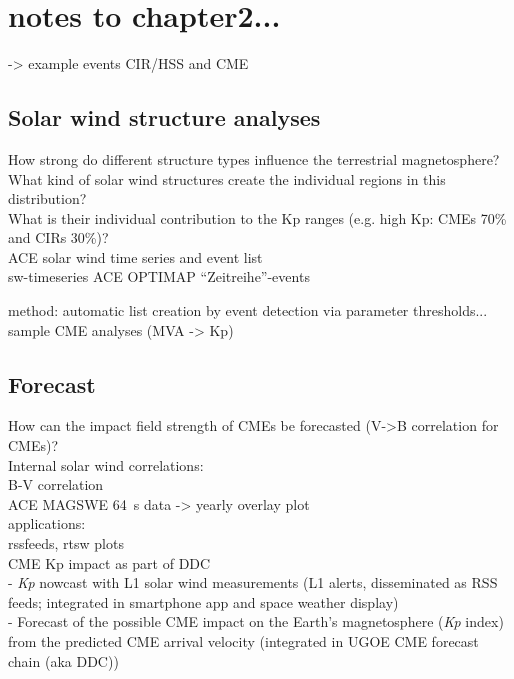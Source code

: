 
\chapter{notes to chapter2...}


-> example events CIR/HSS and CME\\



\section{Solar wind structure analyses}
How strong do different structure types influence the terrestrial magnetosphere?\\
What kind of solar wind structures create the individual regions in this distribution?\\
What is their individual contribution to the Kp ranges (e.g. high Kp: CMEs 70\% and CIRs 30\%)?\\

ACE solar wind time series and event list\\
sw-timeseries ACE OPTIMAP ``Zeitreihe''-events

method: automatic list creation by event detection via parameter thresholds...\\

sample CME analyses (MVA -> Kp)\\


\section{Forecast}
How can the impact field strength of CMEs be forecasted (V->B correlation for CMEs)?\\
Internal solar wind correlations:\\
B-V correlation\\
ACE MAGSWE 64~s data -> yearly overlay plot\\

applications:\\
rssfeeds, rtsw plots\\
CME Kp impact as part of DDC\\
- \textit{Kp} nowcast with L1 solar wind measurements (L1 alerts, disseminated as RSS feeds; integrated in smartphone app and space weather display)\\
- Forecast of the possible CME impact on the Earth's magnetosphere (\textit{Kp} index) from the predicted CME arrival velocity (integrated in UGOE CME forecast chain (aka DDC))\\


